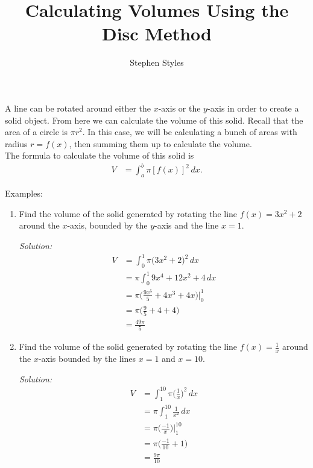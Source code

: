 \documentclass[16pt]{article}
\title{Calculating Volumes Using the Disc Method}
\author{Stephen Styles}
\theoremstyle{remark}
\begin{document}
\maketitle

A line can be rotated around either the $x$-axis or the $y$-axis in order to create a solid object. From here we can calculate the volume of this solid. Recall that the area of a circle is $\pi r^2$. In this case, we will be calculating a bunch of areas with radius $r = f(x)$, then summing them up to calculate the volume. \\

The formula to calculate the volume of this solid is 
\begin{align*}
V &= \int_a^b \pi {[ f(x) ]}^2 \, dx.
\end{align*}

Examples:
\begin{enumerate}
\item Find the volume of the solid generated by rotating the line $f(x) = 3x^2 + 2$ around the $x$-axis, bounded by the $y$-axis and the line $x=1$.
\begin{mdframed}[style=TheoremFrame]
\textit{Solution:}
\begin{align*}
V&= \int_0^1 \pi \big(3x^2+2 \big)^2 \, dx\\
&= \pi \int_0^1 9x^4 + 12x^2 + 4 \, dx\\
&= \pi \big( \frac{9x^5}{5} + 4x^3 + 4x \big) \bigg|_0^1\\
&= \pi \big(\frac{9}{5} + 4 + 4 \big)\\
&= \frac{49\pi}{5}
\end{align*}
\end{mdframed}
\item Find the volume of the solid generated by rotating the line $f(x) = \frac{1}{x}$ around the $x$-axis bounded by the lines $x=1$ and $x=10$.
\begin{mdframed}[style=TheoremFrame]
\textit{Solution:}
\begin{align*}
V &= \int_1^{10} \pi \bigg(\frac{1}{x}\bigg)^2 \, dx\\
&= \pi \int_1^{10} \frac{1}{x^2} \, dx\\
&= \pi \bigg(\frac{-1}{x}\bigg) \bigg|_1^{10}\\
&= \pi \bigg( \frac{-1}{10}+1\bigg)\\
&= \frac{9\pi}{10}
\end{align*}
\end{mdframed}
\end{enumerate}
\end{document}
